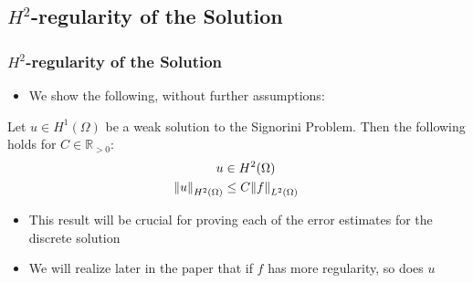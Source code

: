 \subsection{$H^2$-regularity of the Solution}
\begin{frame}
	\frametitle{$H^2$-regularity of the Solution}
	\begin{itemize}
		\item We show the following, without further assumptions:
	\end{itemize}
\begin{theorem} 
	Let $u \in H^1(\Omega)$ be a weak solution to the Signorini Problem. Then the following holds for $C \in \mathbb{R}_{>0}:$
	\begin{align}
		u &\in H^2(\Omega) \\
		\norm{u}_{H^2(\Omega)} &\leq C\norm{f}_{L^2(\Omega)}  
	\end{align}
\end{theorem}
\begin{itemize}
	\item This result will be crucial for proving each of the error estimates for the discrete solution
	\item We will realize later in the paper that if $f$ has more regularity, so does $u$
\end{itemize}
\end{frame}

